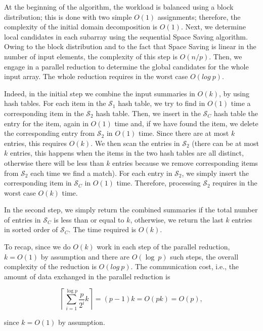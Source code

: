 \documentclass[final,3p,times]{elsarticle}
\newcommand\noi{\noindent}
\begin{document}
At the beginning of the algorithm, the workload is balanced using a block
distribution; this is done with two simple $O(1)$ assignments; therefore, the complexity of the initial domain decomposition is $O(1)$. Next,
we determine local candidates in each subarray using the sequential Space Saving algorithm. Owing to the block distribution and to the fact that Space Saving is linear in the
number of input elements, the complexity of this step is $O(n/p)$. Then, we engage in a parallel reduction to
determine the global candidates for the whole input array. The whole reduction requires in the worst case $O(log~p)$.

Indeed, in the initial step we combine the input summaries in $O(k)$, by using hash tables. For each item in the $\mathcal{S}_1$ hash table, we try to find in $O(1)$ time a corresponding item in the $\mathcal{S}_2$ hash table. Then, we insert in the $\mathcal{S}_C$ hash table the entry for the item, again in $O(1)$ time and, if we have found the item, we delete the corresponding entry from $\mathcal{S}_2$ in $O(1)$ time. Since there are at most $k$ entries, this requires $O(k)$. We then scan the entries in $\mathcal{S}_2$  (there can be at most $k$ entries, this happens when the items in the two hash tables are all distinct, otherwise there will be less than $k$ entries because we remove corresponding items from $\mathcal{S}_2$ each time we find a match). For each entry in $\mathcal{S}_2$, we simply insert the corresponding item in $\mathcal{S}_C$ in $O(1)$ time. Therefore, processing $\mathcal{S}_2$ requires in the worst case $O(k)$ time.

In the second step, we simply return the combined summaries if the total number of entries in $\mathcal{S}_C$ is less than or equal to $k$, otherwise, we return the last $k$ entries in sorted order of $\mathcal{S}_C$. The time required is $O(k)$.

To recap, since we do $O(k)$ work in each step of the parallel reduction, $k = O(1)$ by assumption and there are $O(\log~p)$ such steps, the overall complexity of the reduction is  $O(log~p)$. The communication cost, i.e., the amount of data exchanged in the parallel reduction is 

\begin{equation}
\left\lceil {\sum\limits_{i = 1}^{\log p} {\frac{p}{{{2^i}}}} k} \right\rceil  = (p - 1)k = O(pk) = O(p),
\end{equation}

\noi since $k = O(1)$ by assumption.
\end{document}
